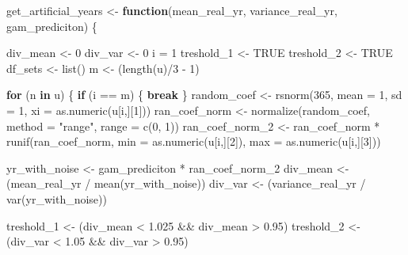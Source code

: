\documentclass[
]{article}
\newenvironment{Shaded}{\begin{snugshade}}{\end{snugshade}}
\newcommand{\AttributeTok}[1]{\textcolor[rgb]{0.77,0.63,0.00}{#1}}
\newcommand{\ConstantTok}[1]{\textcolor[rgb]{0.00,0.00,0.00}{#1}}
\newcommand{\ControlFlowTok}[1]{\textcolor[rgb]{0.13,0.29,0.53}{\textbf{#1}}}
\newcommand{\DecValTok}[1]{\textcolor[rgb]{0.00,0.00,0.81}{#1}}
\newcommand{\FloatTok}[1]{\textcolor[rgb]{0.00,0.00,0.81}{#1}}
\newcommand{\FunctionTok}[1]{\textcolor[rgb]{0.00,0.00,0.00}{#1}}
\newcommand{\NormalTok}[1]{#1}
\newcommand{\OtherTok}[1]{\textcolor[rgb]{0.56,0.35,0.01}{#1}}
\newcommand{\SpecialCharTok}[1]{\textcolor[rgb]{0.00,0.00,0.00}{#1}}
\newcommand{\StringTok}[1]{\textcolor[rgb]{0.31,0.60,0.02}{#1}}
\begin{document}
\begin{Shaded}
\begin{Highlighting}[]
\NormalTok{get\_artificial\_years }\OtherTok{\textless{}{-}} \ControlFlowTok{function}\NormalTok{(mean\_real\_yr, variance\_real\_yr, gam\_prediciton) \{}
  
\NormalTok{  div\_mean }\OtherTok{\textless{}{-}} \DecValTok{0}
\NormalTok{  div\_var }\OtherTok{\textless{}{-}} \DecValTok{0}
\NormalTok{  i }\OtherTok{=} \DecValTok{1}
\NormalTok{  treshold\_1 }\OtherTok{\textless{}{-}} \ConstantTok{TRUE}
\NormalTok{  treshold\_2 }\OtherTok{\textless{}{-}} \ConstantTok{TRUE}
\NormalTok{  df\_sets }\OtherTok{\textless{}{-}} \FunctionTok{list}\NormalTok{()}
\NormalTok{  m }\OtherTok{\textless{}{-}}\NormalTok{ (}\FunctionTok{length}\NormalTok{(u)}\SpecialCharTok{/}\DecValTok{3} \SpecialCharTok{{-}} \DecValTok{1}\NormalTok{)}
  
  \ControlFlowTok{for}\NormalTok{ (n }\ControlFlowTok{in}\NormalTok{ u) \{}
    \ControlFlowTok{if}\NormalTok{ (i }\SpecialCharTok{==}\NormalTok{ m) \{}
      \ControlFlowTok{break}
\NormalTok{    \}}
\NormalTok{    random\_coef }\OtherTok{\textless{}{-}} \FunctionTok{rsnorm}\NormalTok{(}\DecValTok{365}\NormalTok{, }\AttributeTok{mean =} \DecValTok{1}\NormalTok{, }\AttributeTok{sd =} \DecValTok{1}\NormalTok{, }\AttributeTok{xi =} \FunctionTok{as.numeric}\NormalTok{(u[i,][}\DecValTok{1}\NormalTok{]))}
\NormalTok{    ran\_coef\_norm }\OtherTok{\textless{}{-}} \FunctionTok{normalize}\NormalTok{(random\_coef, }\AttributeTok{method =} \StringTok{"range"}\NormalTok{, }\AttributeTok{range =} \FunctionTok{c}\NormalTok{(}\DecValTok{0}\NormalTok{, }\DecValTok{1}\NormalTok{))}
\NormalTok{    ran\_coef\_norm\_2 }\OtherTok{\textless{}{-}}\NormalTok{ ran\_coef\_norm }\SpecialCharTok{*} \FunctionTok{runif}\NormalTok{(ran\_coef\_norm, }\AttributeTok{min =} \FunctionTok{as.numeric}\NormalTok{(u[i,][}\DecValTok{2}\NormalTok{]), }\AttributeTok{max =} \FunctionTok{as.numeric}\NormalTok{(u[i,][}\DecValTok{3}\NormalTok{]))}

\NormalTok{    yr\_with\_noise }\OtherTok{\textless{}{-}}\NormalTok{ gam\_prediciton }\SpecialCharTok{*}\NormalTok{ ran\_coef\_norm\_2}
\NormalTok{    div\_mean }\OtherTok{\textless{}{-}}\NormalTok{ (mean\_real\_yr }\SpecialCharTok{/} \FunctionTok{mean}\NormalTok{(yr\_with\_noise))}
\NormalTok{    div\_var }\OtherTok{\textless{}{-}}\NormalTok{ (variance\_real\_yr }\SpecialCharTok{/} \FunctionTok{var}\NormalTok{(yr\_with\_noise))}
       
\NormalTok{    treshold\_1 }\OtherTok{\textless{}{-}}\NormalTok{ (div\_mean }\SpecialCharTok{\textless{}} \FloatTok{1.025}  \SpecialCharTok{\&\&}\NormalTok{ div\_mean }\SpecialCharTok{\textgreater{}} \FloatTok{0.95}\NormalTok{)}
\NormalTok{    treshold\_2 }\OtherTok{\textless{}{-}}\NormalTok{ (div\_var }\SpecialCharTok{\textless{}} \FloatTok{1.05} \SpecialCharTok{\&\&}\NormalTok{ div\_var }\SpecialCharTok{\textgreater{}} \FloatTok{0.95}\NormalTok{)}
    

\end{Highlighting}
\end{Shaded}
\end{document}
